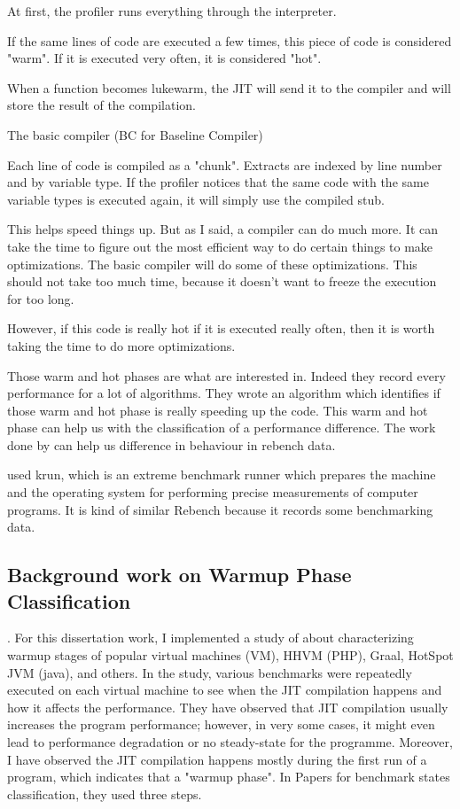\documentclass{article}
\begin{document}
At first, the profiler runs everything through the interpreter.

If the same lines of code are executed a few times, this piece of code is considered "warm". If it is executed very often, it is considered "hot".

When a function becomes lukewarm, the JIT will send it to the compiler and will store the result of the compilation.

The basic compiler (BC for Baseline Compiler)

Each line of code is compiled as a "chunk". Extracts are indexed by line number and by variable type. If the profiler notices that the same code with the same variable types is executed again, it will simply use the compiled stub.

This helps speed things up. But as I said, a compiler can do much more. It can take the time to figure out the most efficient way to do certain things to make optimizations. The basic compiler will do some of these optimizations. This should not take too much time, because it doesn't want to freeze the execution for too long.

However, if this code is really hot if it is executed really often, then it is worth taking the time to do more optimizations.

Those warm and hot phases are what \citep{barrett2017virtual} are interested in. Indeed they record every performance for a lot of algorithms. They wrote an algorithm which identifies if those warm and hot phase is really speeding up the code. This warm and hot phase can help us with the classification of a performance difference. The work done by \citep{barrett2017virtual} can help us difference in behaviour in rebench data.

\citep{barrett2017virtual} used krun, which is an extreme benchmark runner which prepares the machine and the operating system for performing precise measurements of computer programs. It is kind of similar Rebench because it records some benchmarking data.

\subsection{Background work on Warmup Phase Classification}

.
For this dissertation work, I implemented a study of \citep{barrett2017virtual} about characterizing warmup stages of popular virtual machines (VM), HHVM (PHP), Graal, HotSpot JVM (java), and others. 
In the study, various benchmarks were repeatedly executed on each virtual machine to see when the JIT compilation happens and how it affects the performance.
They have observed that JIT compilation usually increases the program performance; however, in very some cases, it might even lead to performance degradation or no steady-state for the programme. Moreover, I have observed the JIT compilation happens mostly during the first run of a program, which indicates that a "warmup phase".
In \citep{barrett2017virtual} Papers for benchmark states classification, they used three steps.
\end{document}
